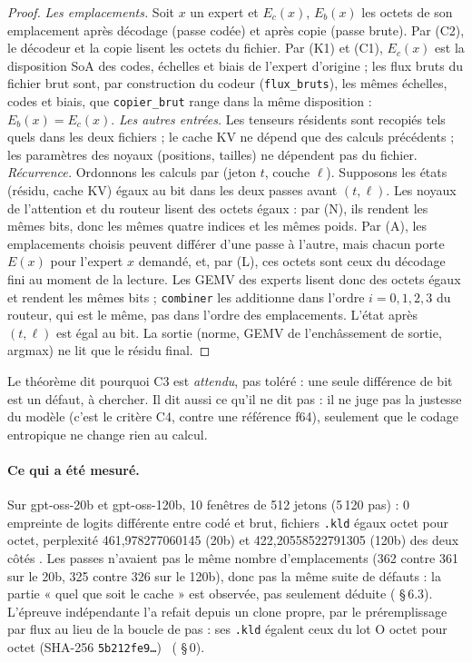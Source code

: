 \begin{proof}
\emph{Les emplacements.} Soit $x$ un expert et $E_c(x)$, $E_b(x)$ les octets de son emplacement après décodage (passe codée) et après copie (passe brute). Par (C2), le décodeur et la copie lisent les octets du fichier. Par (K1) et (C1), $E_c(x)$ est la disposition SoA des codes, échelles et biais de l'expert d'origine ; les flux bruts du fichier brut sont, par construction du codeur (\texttt{flux\_bruts}), les mêmes échelles, codes et biais, que \texttt{copier\_brut} range dans la même disposition : $E_b(x) = E_c(x)$.
\emph{Les autres entrées.} Les tenseurs résidents sont recopiés tels quels dans les deux fichiers ; le cache KV ne dépend que des calculs précédents ; les paramètres des noyaux (positions, tailles) ne dépendent pas du fichier.
\emph{Récurrence.} Ordonnons les calculs par (jeton $t$, couche $\ell$). Supposons les états (résidu, cache KV) égaux au bit dans les deux passes avant $(t, \ell)$. Les noyaux de l'attention et du routeur lisent des octets égaux : par (N), ils rendent les mêmes bits, donc les mêmes quatre indices et les mêmes poids. Par (A), les emplacements choisis peuvent différer d'une passe à l'autre, mais chacun porte $E(x)$ pour l'expert $x$ demandé, et, par (L), ces octets sont ceux du décodage fini au moment de la lecture. Les GEMV des experts lisent donc des octets égaux et rendent les mêmes bits ; \texttt{combiner} les additionne dans l'ordre $i = 0, 1, 2, 3$ du routeur, qui est le même, pas dans l'ordre des emplacements. L'état après $(t, \ell)$ est égal au bit. La sortie (norme, GEMV de l'enchâssement de sortie, argmax) ne lit que le résidu final.
\end{proof}

Le théorème dit pourquoi C3 est \emph{attendu}, pas toléré : une seule différence de bit est un défaut, à chercher. Il dit aussi ce qu'il ne dit pas : il ne juge pas la justesse du modèle (c'est le critère C4, contre une référence f64), seulement que le codage entropique ne change rien au calcul.

\paragraph{Ce qui a été mesuré.} Sur gpt-oss-20b et gpt-oss-120b, 10 fenêtres de 512 jetons (5\,120 pas) : 0 empreinte de logits différente entre codé et brut, fichiers \texttt{.kld} égaux octet pour octet, perplexité 461,978277060145 (20b) et 422,20558522791305 (120b) des deux côtés \mes. Les passes n'avaient pas le même nombre d'emplacements (362 contre 361 sur le 20b, 325 contre 326 sur le 120b), donc pas la même suite de défauts : la partie « quel que soit le cache » est observée, pas seulement déduite ( §\,6.3). L'épreuve indépendante l'a refait depuis un clone propre, par le préremplissage par flux au lieu de la boucle de pas : ses \texttt{.kld} égalent ceux du lot O octet pour octet (SHA-256 \texttt{5b212fe9…}) \mes~( §\,0).

